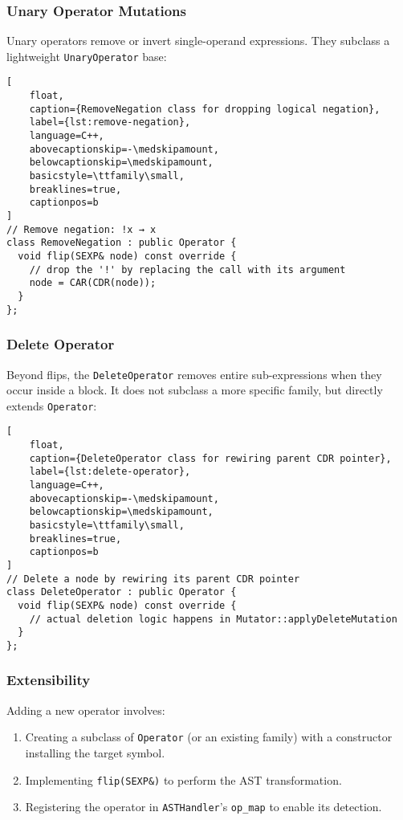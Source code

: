 \subsubsection{Unary Operator Mutations}

Unary operators remove or invert single-operand expressions. They subclass a lightweight \texttt{UnaryOperator} base:

\begin{lstlisting}[
    float,
    caption={RemoveNegation class for dropping logical negation},
    label={lst:remove-negation},
    language=C++,
    abovecaptionskip=-\medskipamount,
    belowcaptionskip=\medskipamount,
    basicstyle=\ttfamily\small,
    breaklines=true,
    captionpos=b
]
// Remove negation: !x → x
class RemoveNegation : public Operator {
  void flip(SEXP& node) const override {
    // drop the '!' by replacing the call with its argument
    node = CAR(CDR(node));
  }
};
\end{lstlisting}


\subsubsection{Delete Operator}

Beyond flips, the \texttt{DeleteOperator} removes entire sub-expressions when they occur inside a block. It does not subclass a more specific family, but directly extends \texttt{Operator}:

\begin{lstlisting}[
    float,
    caption={DeleteOperator class for rewiring parent CDR pointer},
    label={lst:delete-operator},
    language=C++,
    abovecaptionskip=-\medskipamount,
    belowcaptionskip=\medskipamount,
    basicstyle=\ttfamily\small,
    breaklines=true,
    captionpos=b
]
// Delete a node by rewiring its parent CDR pointer
class DeleteOperator : public Operator {
  void flip(SEXP& node) const override {
    // actual deletion logic happens in Mutator::applyDeleteMutation
  }
};
\end{lstlisting}


\subsubsection{Extensibility}

Adding a new operator involves:

\begin{enumerate}
  \item Creating a subclass of \texttt{Operator} (or an existing family) with a constructor installing the target symbol.
  \item Implementing \texttt{flip(SEXP\&)} to perform the AST transformation.
  \item Registering the operator in \texttt{ASTHandler}’s \texttt{op_map} to enable its detection.
\end{enumerate}

